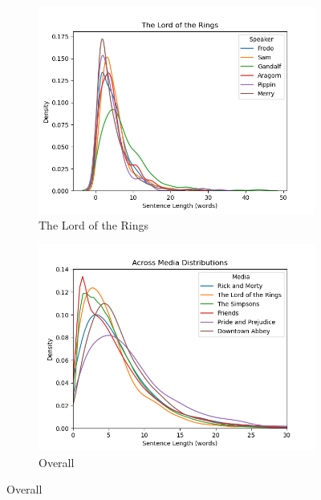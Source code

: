 \documentclass{article}
\begin{document}
\begin{titlepage}
\begin{figure}[H]
    \centering
    \caption{Within- and Across- Media Sentence Length Distributions}
    \begin{subfigure}[b]{0.45\textwidth}
        \centering
        \includegraphics[width=\textwidth]{images/The Lord of the Rings_sentence_length.png}
        \caption{The Lord of the Rings}
        \label{fig:subfig1}
    \end{subfigure}
    \hfill
    \begin{subfigure}[b]{0.45\textwidth}
        \centering
        \includegraphics[width=\textwidth]{images/overall_sentence_length.png}
        \caption{Overall}
        \label{fig:subfig2}
    \end{subfigure}
    \label{fig:main}
\end{figure} 


\end{titlepage}
\end{document}
